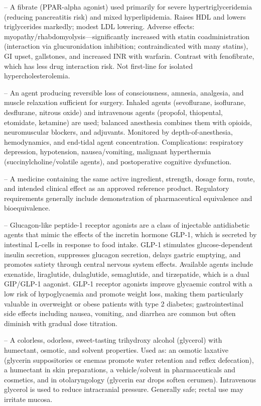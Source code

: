 -- A fibrate (PPAR-alpha agonist) used primarily for severe hypertriglyceridemia (reducing pancreatitis risk) and mixed hyperlipidemia. Raises HDL and lowers triglycerides markedly; modest LDL lowering. Adverse effects: myopathy/rhabdomyolysis—significantly increased with statin coadministration (interaction via glucuronidation inhibition; contraindicated with many statins), GI upset, gallstones, and increased INR with warfarin. Contrast with fenofibrate, which has less drug interaction risk. Not first-line for isolated hypercholesterolemia.

-- An agent producing reversible loss of consciousness, amnesia, analgesia, and muscle relaxation sufficient for surgery. Inhaled agents (sevoflurane, isoflurane, desflurane, nitrous oxide) and intravenous agents (propofol, thiopental, etomidate, ketamine) are used; balanced anesthesia combines them with opioids, neuromuscular blockers, and adjuvants. Monitored by depth-of-anesthesia, hemodynamics, and end-tidal agent concentration. Complications: respiratory depression, hypotension, nausea/vomiting, malignant hyperthermia (succinylcholine/volatile agents), and postoperative cognitive dysfunction.

-- A medicine containing the same active ingredient, strength, dosage form, route, and intended clinical effect as an approved reference product. Regulatory requirements generally include demonstration of pharmaceutical equivalence and bioequivalence.

-- Glucagon-like peptide-1 receptor agonists are a class of injectable antidiabetic agents that mimic the effects of the incretin hormone GLP-1, which is secreted by intestinal L-cells in response to food intake. GLP-1 stimulates glucose-dependent insulin secretion, suppresses glucagon secretion, delays gastric emptying, and promotes satiety through central nervous system effects. Available agents include exenatide, liraglutide, dulaglutide, semaglutide, and tirzepatide, which is a dual GIP/GLP-1 aagonist. GLP-1 receptor agonists improve glycaemic control with a low risk of hypoglycaemia and promote weight loss, making them particularly valuable in overweight or obese patients with type 2 diabetes; gastrointestinal side effects including nausea, vomiting, and diarrhea are common but often diminish with gradual dose titration.

-- A colorless, odorless, sweet-tasting trihydroxy alcohol (glycerol) with humectant, osmotic, and solvent properties. Used as: an osmotic laxative (glycerin suppositories or enemas promote water retention and reflex defecation), a humectant in skin preparations, a vehicle/solvent in pharmaceuticals and cosmetics, and in otolaryngology (glycerin ear drops soften cerumen). Intravenous glycerol is used to reduce intracranial pressure. Generally safe; rectal use may irritate mucosa.

